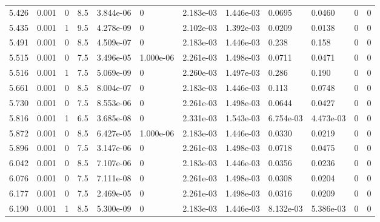 \documentclass[preview]{standalone}
\begin{document}
{{{\begin{tabular}{L{1.2cm}C{1.2cm} C{0.3cm}C{0.5cm} C{1.4cm}C{1.4cm} C{1.4cm}C{1.4cm} C{1.6cm}C{1.6cm} C{1.6cm}C{1.6cm}}
  5.426  &  0.001  & 0     & 8.5 &  3.844e-06  & 0  &  2.183e-03&   1.446e-03& 0.0695 & 0.0460   &  0 & 0  \\ 
  5.435  &  0.001  & 1     & 9.5 &  4.278e-09  & 0  &  2.102e-03&   1.392e-03& 0.0209 & 0.0138   &  0 & 0  \\ 
  5.491  &  0.001  & 0     & 8.5 &  4.509e-07  & 0  &  2.183e-03&   1.446e-03& 0.238 & 0.158   &  0 & 0  \\ 
  5.515  &  0.001  & 0     & 7.5 &  3.496e-05  & 1.000e-06  &  2.261e-03&   1.498e-03& 0.0711 & 0.0471   &  0 & 0  \\ 
  5.516  &  0.001  & 1     & 7.5 &  5.069e-09  & 0  &  2.260e-03&   1.497e-03& 0.286 & 0.190   &  0 & 0  \\ 
  5.661  &  0.001  & 0     & 8.5 &  8.004e-07  & 0  &  2.183e-03&   1.446e-03& 0.113 & 0.0748   &  0 & 0  \\ 
  5.730  &  0.001  & 0     & 7.5 &  8.553e-06  & 0  &  2.261e-03&   1.498e-03& 0.0644 & 0.0427   &  0 & 0  \\ 
  5.816  &  0.001  & 1     & 6.5 &  3.685e-08  & 0  &  2.331e-03&   1.543e-03& 6.754e-03 & 4.473e-03   &  0 & 0  \\ 
  5.872  &  0.001  & 0     & 8.5 &  6.427e-05  & 1.000e-06  &  2.183e-03&   1.446e-03& 0.0330 & 0.0219   &  0 & 0  \\ 
  5.896  &  0.001  & 0     & 7.5 &  3.147e-06  & 0  &  2.261e-03&   1.498e-03& 0.0718 & 0.0475   &  0 & 0  \\ 
  6.042  &  0.001  & 0     & 8.5 &  7.107e-06  & 0  &  2.183e-03&   1.446e-03& 0.0356 & 0.0236   &  0 & 0  \\ 
  6.076  &  0.001  & 0     & 7.5 &  7.111e-08  & 0  &  2.261e-03&   1.498e-03& 0.0308 & 0.0204   &  0 & 0  \\ 
  6.177  &  0.001  & 0     & 7.5 &  2.469e-05  & 0  &  2.261e-03&   1.498e-03& 0.0316 & 0.0209   &  0 & 0  \\ 
  6.190  &  0.001  & 1     & 8.5 &  5.300e-09  & 0  &  2.183e-03&   1.446e-03& 8.132e-03 & 5.386e-03   &  0 & 0  \\ 
\hline 
\end{tabular} 

}}}
\end{document}
